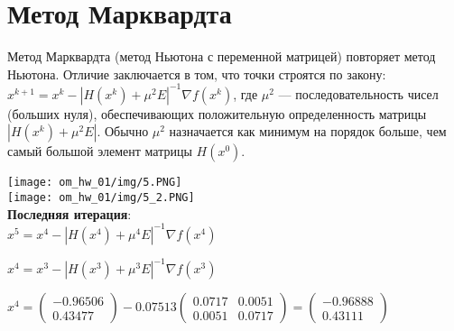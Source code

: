 \section{Метод Марквардта}

Метод Марквардта (метод Ньютона с переменной матрицей) повторяет метод Ньютона. Отличие заключается в том, что точки строятся по закону:
$ x^{k+1} = x^{k} - |H(x^{k}) + \mu^{2}E|^{-1} \nabla f(x^{k})$, где $\mu^{2}$ --- последовательность чисел (больших нуля), обеспечивающих положительную определенность матрицы $|H(x^{k}) + \mu^{2}E|$. Обычно $\mu^{2}$ назначается как минимум на порядок больше, чем самый большой элемент матрицы $H(x^{0})$.

\texttt{[image: om\_hw\_01/img/5.PNG]}\\
\texttt{[image: om\_hw\_01/img/5\_2.PNG]}\\

\textbf{Последняя итерация}:\\
$x^{5} = x^{4} - |H(x^{4}) + \mu^{4}E|^{-1} \nabla f(x^{4})$

$x^{4} = x^{3} - |H(x^{3}) + \mu^{3}E|^{-1} \nabla f(x^{3})$

$
x^{4} = 
\begin{pmatrix}
  -0.96506\\
  0.43477
\end{pmatrix}
- 0.07513
\begin{pmatrix}
  0.0717 & 0.0051\\
  0.0051 & 0.0717
\end{pmatrix}
=
\begin{pmatrix}
  -0.96888\\
  0.43111
\end{pmatrix}
$

\pagebreak